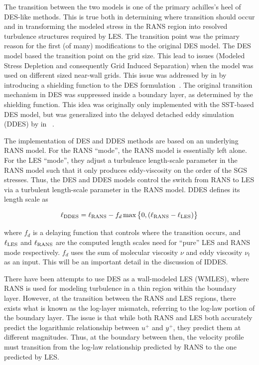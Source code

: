 \documentclass{ucb}
\newcommand{\RANS}{\textup{RANS}}
\newcommand{\LES}{\textup{LES}}
\newcommand{\DDES}{\textup{DDES}}
\begin{document}
The transition between the two models is one of the primary achilles's heel of DES-like methods. This is true both in determining where transition should occur and in transforming the modeled stress in the RANS region into resolved turbulence structures required by LES. The transition point was the primary reason for the first (of many) modifications to the original DES model. The DES model based the transition point on the grid size. This lead to issues (Modeled Stress Depletion and consequently Grid Induced Separation) when the model was used on different sized near-wall grids. This issue was addressed by \citeauthor{Menter2002} in  by introducing a shielding function to the DES formulation~\cite{Menter2002}. The original transition mechanism in DES was suppressed inside a boundary layer, as determined by the shielding function. This idea was originally only implemented with the SST-based DES model, but was generalized into the delayed detached eddy simulation (DDES) by \citeauthor{Spalart2006} in ~\cite{Spalart2006}. 

The implementation of DES and DDES methods are based on an underlying RANS model. For the RANS ``mode'', the RANS model is essentially left alone. For the LES ``mode'', they adjust a turbulence length-scale parameter in the RANS model such that it only produces eddy-viscosity on the order of the SGS stresses. Thus, the DES and DDES models control the switch from RANS to LES via a turbulent length-scale parameter in the RANS model. DDES defines its length scale as 

\begin{equation}\label{eq:ellDDES}
    \ell_{\DDES} = \ell_{\RANS} 
    - f_d \max \left \{ 0, \left(\ell_\RANS - \ell_\LES \right) \right\}
\end{equation}

where \(f_d \) is a delaying function that controls where the transition occurs, and \(\ell_\LES \) and \(\ell_\RANS \) are the computed length scales need for ``pure'' LES and RANS mode respectively. \(f_d \) uses the sum of molecular viscosity \(\nu \) and eddy viscosity \(\nu_t \) as an input. This will be an important detail in the discussion of IDDES.

There have been attempts to use DES as a wall-modeled LES (WMLES), where RANS is used for modeling turbulence in a thin region within the boundary layer. However, at the transition between the RANS and LES regions, there exists what is known as the log-layer mismatch, referring to the log-law portion of the boundary layer. The issue is that while both RANS and LES both accurately predict the logarithmic relationship between \(u^+\) and \(y^+\), they predict them at different magnitudes. Thus, at the boundary between then, the velocity profile must transition from the log-law relationship predicted by RANS to the one predicted by LES.
\end{document}
